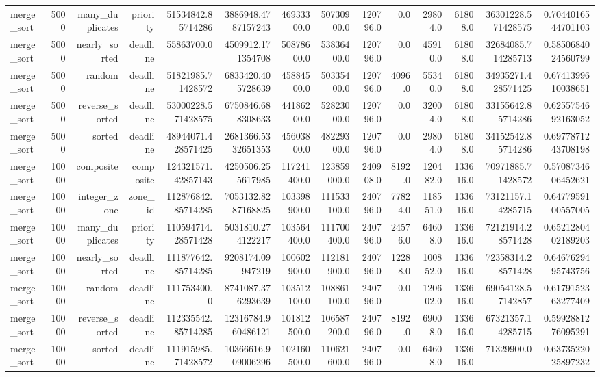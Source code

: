 \begin{table}[htbp]
\begin{tabular}{lrrrrrrrrrrrrr}
merge_sort & 5000 & many_duplicates & priority & 51534842.85714286 & 3886948.4787157243 & 46933300.0 & 50730900.0 & 120796.0 & 0.0 & 29804.0 & 61808.0 & 36301228.571428575 & 0.7044016544701103 \\
merge_sort & 5000 & nearly_sorted & deadline & 55863700.0 & 4509912.171354708 & 50878600.0 & 53836400.0 & 120796.0 & 0.0 & 45910.0 & 61808.0 & 32684085.714285713 & 0.5850684024560799 \\
merge_sort & 5000 & random & deadline & 51821985.71428572 & 6833420.405728639 & 45884500.0 & 50335400.0 & 120796.0 & 4096.0 & 55340.0 & 61808.0 & 34935271.428571425 & 0.6741399610038651 \\
merge_sort & 5000 & reverse_sorted & deadline & 53000228.571428575 & 6750846.688308633 & 44186200.0 & 52823000.0 & 120796.0 & 0.0 & 32004.0 & 61808.0 & 33155642.85714286 & 0.6255754692163052 \\
merge_sort & 5000 & sorted & deadline & 48944071.428571425 & 2681366.5332651353 & 45603800.0 & 48229300.0 & 120796.0 & 0.0 & 29804.0 & 61808.0 & 34152542.85714286 & 0.6977871243708198 \\
merge_sort & 10000 & composite & composite & 124321571.42857143 & 4250506.255617985 & 117241400.0 & 123859000.0 & 240908.0 & 8192.0 & 120482.0 & 133616.0 & 70971885.71428572 & 0.5708734606452621 \\
merge_sort & 10000 & integer_zone & zone_id & 112876842.85714285 & 7053132.8287168825 & 103398900.0 & 111533100.0 & 240796.0 & 77824.0 & 118551.0 & 133616.0 & 73121157.14285715 & 0.6477959100557005 \\
merge_sort & 10000 & many_duplicates & priority & 110594714.28571428 & 5031810.274122217 & 103564400.0 & 111700400.0 & 240796.0 & 24576.0 & 64608.0 & 133616.0 & 72121914.28571428 & 0.6521280402189203 \\
merge_sort & 10000 & nearly_sorted & deadline & 111877642.85714285 & 9208174.09947219 & 100602900.0 & 112181900.0 & 240796.0 & 12288.0 & 100852.0 & 133616.0 & 72358314.28571428 & 0.6467629495743756 \\
merge_sort & 10000 & random & deadline & 111753400.0 & 8741087.376293639 & 103512100.0 & 108861100.0 & 240796.0 & 0.0 & 120602.0 & 133616.0 & 69054128.57142857 & 0.6179152363277409 \\
merge_sort & 10000 & reverse_sorted & deadline & 112335542.85714285 & 12316784.960486121 & 101812500.0 & 106587200.0 & 240796.0 & 8192.0 & 69008.0 & 133616.0 & 67321357.14285715 & 0.5992881276095291 \\
merge_sort & 10000 & sorted & deadline & 111915985.71428572 & 10366616.909006296 & 102160500.0 & 110621600.0 & 240796.0 & 0.0 & 64608.0 & 133616.0 & 71329900.0 & 0.6373522025897232 \\

\end{tabular}
\end{table}
